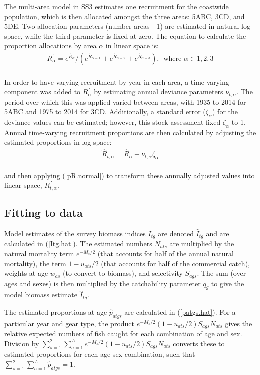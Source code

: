 \documentclass[11pt]{book}
\def\vsd{\vspace*{1ex}}%
\newcommand{\eref}[1]{(\ref{#1})}
\renewcommand{\eb}{\vsd \vsd \begin{eqnarray}}
\renewcommand{\ee}{\end{eqnarray} \vsd }
\begin{document}
The multi-area model in SS3 estimates one recruitment for the coastwide population, which is then allocated amongst the three areas: 5ABC, 3CD, and 5DE. 
Two allocation parameters (number areas - 1) are estimated in natural log space, while the third parameter is fixed at zero. 
The equation to calculate the proportion allocations by area $\alpha$ in linear space is:
\eb
R^{\,\prime}_{\alpha} = e^{\widehat{R}_{\alpha}} / ( e^{\widehat{R}_{\alpha=1}} + e^{\widehat{R}_{\alpha=2}} + e^{\widehat{R}_{\alpha=3}} ) \text{,~~where~} \alpha \in{1,2,3}
\label{pR.normal}
\ee \\[-0.25ex]
In order to have varying recruitment by year in each area, a time-varying component was added to $R^{\,\prime}_{\alpha}$ by estimating annual deviance parameters $\nu_{t,\alpha}$.
The period over which this was applied varied between areas, with 1935 to 2014 for 5ABC and 1975 to 2014 for 3CD.
Additionally, a standard error ($\zeta_{\alpha}$) for the deviance values can be estimated; however, this stock assessment fixed $\zeta_{\alpha}$ to 1. 
Annual time-varying recruitment proportions are then calculated by adjusting the estimated proportions in log space:
\eb
\widehat{R}_{t,\alpha} = \widehat{R}_{\alpha} + \nu_{t,\alpha} \zeta_{\alpha}
\label{pR.tv}
\ee \\[-0.25ex]
and then applying \eref{pR.normal} to transform these annually adjusted values into linear space, $R^{\,\prime}_{t,\alpha}$.

\subsection{Fitting to data}

Model estimates of the survey biomass indices $I_{tg}$ are denoted $\widehat{I}_{tg}$ and are calculated in \eref{Itg.hat}.
The estimated numbers $N_{ats}$ are multiplied by the natural mortality term $e^{-M_s / 2}$ (that accounts for half of the annual natural mortality), the term $1 - u_{ats} / 2$ (that accounts for half of the commercial catch),  weights-at-age $w_{as}$ (to convert to biomass), and selectivity $S_{ags}$. 
The sum (over ages and sexes) is then multiplied by the catchability parameter $q_g$ to give the model biomass estimate $\widehat{I}_{tg}$. 

The estimated proportions-at-age $\widehat{p}_{atgs}$ are calculated in \eref{patgs.hat}. 
For a particular year and gear type, the product $e^{-M_{s}/2} (1 - u_{ats}/2) S_{ags} N_{ats}$ gives the relative expected numbers of fish caught for each combination of age and sex. 
Division by $\sum_{s=1}^2 \sum_{a=1}^A e^{-M_{s}/2} (1 - u_{ats}/2) S_{ags} N_{ats}$ converts these to estimated proportions for each age-sex combination, such that $\sum_{s=1}^2 \sum_{a=1}^{A} \widehat{p}_{atgs} = 1$.
\end{document}
